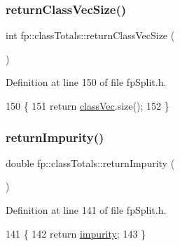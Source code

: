 \subsubsection{\texorpdfstring{return\+Class\+Vec\+Size()}{returnClassVecSize()}}
{\footnotesize\ttfamily int fp\+::class\+Totals\+::return\+Class\+Vec\+Size (\begin{DoxyParamCaption}{ }\end{DoxyParamCaption})\hspace{0.3cm}{\ttfamily [inline]}}



Definition at line 150 of file fp\+Split.\+h.


\begin{DoxyCode}
150                                            \{
151                 \textcolor{keywordflow}{return} \hyperlink{classfp_1_1classTotals_af96102537592dbda8601d0235dfccfca}{classVec}.size();
152             \}
\end{DoxyCode}
\mbox{\label{classfp_1_1classTotals_a82993575e2ad13f057f01050a52ef4ce}} 
\subsubsection{\texorpdfstring{return\+Impurity()}{returnImpurity()}}
{\footnotesize\ttfamily double fp\+::class\+Totals\+::return\+Impurity (\begin{DoxyParamCaption}{ }\end{DoxyParamCaption})\hspace{0.3cm}{\ttfamily [inline]}}



Definition at line 141 of file fp\+Split.\+h.


\begin{DoxyCode}
141                                    \{
142                 \textcolor{keywordflow}{return} \hyperlink{classfp_1_1classTotals_acd239321a9b15e93e6de272c70b301b3}{impurity};
143             \}
\end{DoxyCode}
\mbox{\label{classfp_1_1classTotals_ace51088c43d444d4bcdbe423909c5b91}} 
